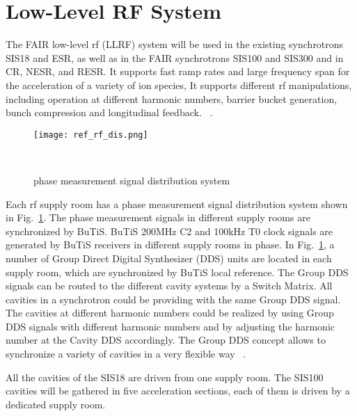 \section{Low-Level RF System}
\label{sec:LLRF}
The FAIR low-level rf (\gls{LLRF}) system will be used in the existing synchrotrons SIS18 and \gls{ESR}, as well as in the FAIR synchrotrons SIS100 and SIS300 and in \gls{CR}, \gls{NESR}, and \gls{RESR}. It supports fast ramp rates and large frequency span for the acceleration of a variety of ion species, It supports different rf manipulations, including operation at different harmonic numbers, barrier bucket generation, bunch compression and longitudinal feedback. ~\cite{klingbeil_new_2011}. 

\begin{figure}[!htb]
   \centering   
   \texttt{[image: ref\_rf\_dis.png]}
   \caption{phase measurement signal distribution system}{~\cite{klingbeil_new_2011}}
   \label{ref_rf_dis}
\end{figure}
Each rf supply room has a phase measurement signal distribution system shown in Fig.~\ref{ref_rf_dis}. The phase measurement signals in different supply rooms are synchronized by BuTiS. BuTiS 200MHz C2 and 100kHz T0 clock signals are generated by BuTiS receivers in different supply rooms in phase. In Fig.~\ref{ref_rf_dis}, a number of Group Direct Digital Synthesizer (DDS) units are located in each supply room, which are synchronized by BuTiS local reference. The Group DDS signals can be routed to the different cavity systems by a Switch Matrix. All cavities in a synchrotron could be providing with the same Group DDS signal. The cavities at different harmonic numbers could be realized by using Group DDS signals with different harmonic numbers and by adjusting the harmonic number at the Cavity DDS accordingly. The Group DDS concept allows to synchronize a variety of cavities in a very flexible way ~\cite{klingbeil_new_2011}. 

All the cavities of the SIS18 are driven from one supply room. The SIS100 cavities will be gathered in five acceleration sections, each of them is driven by a dedicated supply room. 

